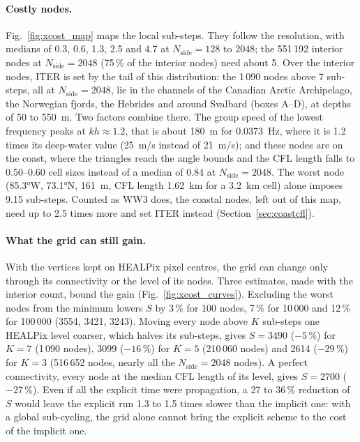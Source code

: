 \documentclass[11pt,a4paper]{article}
\newcommand{\nside}{N_{\mathrm{side}}}
\begin{document}
\paragraph{Costly nodes.} Fig.~\ref{fig:xcost_map} maps the local
sub-steps. They follow the resolution, with medians of 0.3, 0.6, 1.3,
2.5 and 4.7 at $\nside=128$ to 2048; the 551\,192 interior nodes at
$\nside=2048$ (75\,\% of the interior nodes) need about 5. Over the
interior nodes, ITER is set by the tail of this distribution: the 1\,090 nodes above 7
sub-steps, all at $\nside=2048$, lie in the channels of the Canadian
Arctic Archipelago, the Norwegian fjords, the Hebrides and around
Svalbard (boxes A--D), at depths of 50 to \SI{550}{m}. Two factors
combine there. The group speed of the lowest frequency peaks at
$kh\approx1.2$, that is about \SI{180}{m} for \SI{0.0373}{Hz}, where it
is 1.2 times its deep-water value (\SI{25}{m/s} instead of
\SI{21}{m/s}); and these nodes are on the coast, where the triangles
reach the angle bounds and the CFL length falls to 0.50--0.60 cell sizes
instead of a median of 0.84 at $\nside=2048$. The worst node
(\ang{85.3}W, \ang{73.1}N, \SI{161}{m}, CFL length \SI{1.62}{km} for a
\SI{3.2}{km} cell) alone imposes 9.15 sub-steps. Counted as WW3 does, the
coastal nodes, left out of this map, need up to 2.5 times more and set
ITER instead (Section~\ref{sec:coastcfl}).

\paragraph{What the grid can still gain.} With the vertices kept on
HEALPix pixel centres, the grid can change only through its connectivity
or the level of its nodes. Three estimates, made with the interior
count, bound the gain (Fig.~\ref{fig:xcost_curves}). Excluding the worst nodes from the
minimum lowers $S$ by 3\,\% for 100 nodes, 7\,\% for 10\,000 and 12\,\%
for 100\,000 (3554, 3421, 3243). Moving every node above $K$ sub-steps
one HEALPix level coarser, which halves its sub-steps, gives $S=3490$
($-5\,\%$) for $K=7$ (1\,090 nodes), 3099 ($-16\,\%$) for $K=5$
(210\,060 nodes) and 2614 ($-29\,\%$) for $K=3$ (516\,652 nodes, nearly
all the $\nside=2048$ nodes). A perfect connectivity, every node at the
median CFL length of its level, gives $S=2700$ ($-27\,\%$). Even if all
the explicit time were propagation, a 27 to 36\,\% reduction of $S$
would leave the explicit run 1.3 to 1.5 times slower than the implicit
one: with a global sub-cycling, the grid alone cannot bring the explicit
scheme to the cost of the implicit one.
\end{document}
